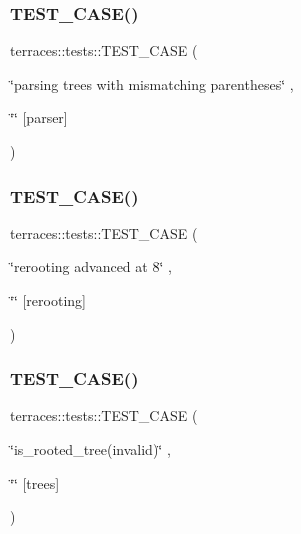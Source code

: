 \subsubsection{\texorpdfstring{T\+E\+S\+T\+\_\+\+C\+A\+S\+E()}{TEST\_CASE()}\hspace{0.1cm}{\footnotesize\ttfamily [64/78]}}
{\footnotesize\ttfamily terraces\+::tests\+::\+T\+E\+S\+T\+\_\+\+C\+A\+SE (\begin{DoxyParamCaption}\item[{\char`\"{}parsing trees with mismatching parentheses\char`\"{}}]{,  }\item[{\char`\"{}\char`\"{}}]{\mbox{[}parser\mbox{]} }\end{DoxyParamCaption})}

\mbox{\label{namespaceterraces_1_1tests_a6c36b35af3f670bdc0528bee8e0d482e}} 
\subsubsection{\texorpdfstring{T\+E\+S\+T\+\_\+\+C\+A\+S\+E()}{TEST\_CASE()}\hspace{0.1cm}{\footnotesize\ttfamily [65/78]}}
{\footnotesize\ttfamily terraces\+::tests\+::\+T\+E\+S\+T\+\_\+\+C\+A\+SE (\begin{DoxyParamCaption}\item[{\char`\"{}rerooting advanced at 8\char`\"{}}]{,  }\item[{\char`\"{}\char`\"{}}]{\mbox{[}rerooting\mbox{]} }\end{DoxyParamCaption})}

\mbox{\label{namespaceterraces_1_1tests_af3da7e414edda2c37e065e9f228b63c7}} 
\subsubsection{\texorpdfstring{T\+E\+S\+T\+\_\+\+C\+A\+S\+E()}{TEST\_CASE()}\hspace{0.1cm}{\footnotesize\ttfamily [66/78]}}
{\footnotesize\ttfamily terraces\+::tests\+::\+T\+E\+S\+T\+\_\+\+C\+A\+SE (\begin{DoxyParamCaption}\item[{\char`\"{}is\+\_\+rooted\+\_\+tree(invalid)\char`\"{}}]{,  }\item[{\char`\"{}\char`\"{}}]{\mbox{[}trees\mbox{]} }\end{DoxyParamCaption})}

